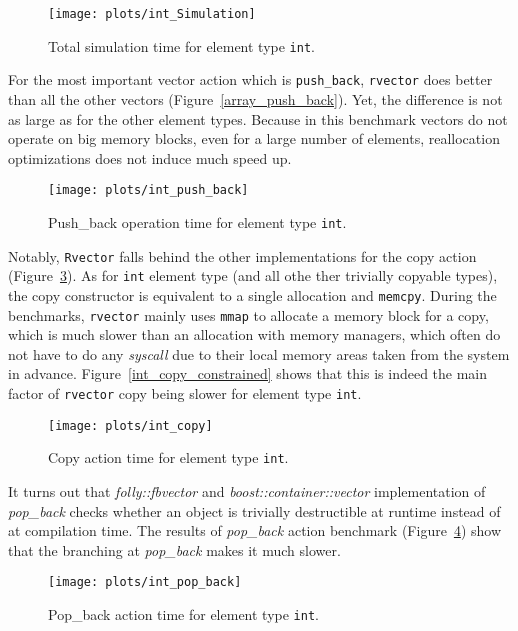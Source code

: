 \documentclass[inz, english, shortabstract]{iithesis}
\begin{document}
\begin{figure}[h!]
\texttt{[image: plots/int\_Simulation]}
\caption{Total simulation time for element type \lstinline{int}{}.}
\label{int_simulation}
\end{figure}

For the most important vector action which is {\tt push\_back}, {\tt rvector} does better than all the other vectors (Figure~\ref{array_push_back}).
Yet, the difference is not as large as for the other element types. Because in this benchmark vectors do not operate on big memory blocks, even for a large number of elements, reallocation optimizations does not induce much speed up.

\begin{figure}[h!]
\texttt{[image: plots/int\_push\_back]}
\caption{Push\_back operation time for element type \lstinline{int}{}.}
\label{int_push_back}
\end{figure}


Notably, {\tt Rvector} falls behind the other implementations for the copy action (Figure~\ref{int_copy}).
As for \lstinline{int}{} element type (and all othe ther trivially copyable types), the copy constructor is equivalent to a single allocation and {\tt memcpy}. During the benchmarks, {\tt rvector} mainly uses {\tt mmap} to allocate a memory block for a copy, which is much slower than an allocation with memory managers, which often do not have to do any \emph{syscall} due to their local memory areas taken from the system in advance.
Figure~\ref{int_copy_constrained} shows that this is indeed the main factor of {\tt rvector} copy being slower for element type \lstinline{int}{}.

\begin{figure}[h!]
\texttt{[image: plots/int\_copy]}
\caption{Copy action time for element type \lstinline{int}{}.}
\label{int_copy}
\end{figure}


It turns out that {\it folly::fbvector} and {\it boost::container::vector} implementation of {\it pop\_back} checks whether an object is trivially destructible at runtime instead of at compilation time. The results of {\it pop\_back} action benchmark (Figure~\ref{int_pop_back}) show that the branching at {\it pop\_back} makes it much slower.

\begin{figure}[h!]
\texttt{[image: plots/int\_pop\_back]}
\caption{Pop\_back action time for element type \lstinline{int}{}.}
\label{int_pop_back}
\end{figure}
\end{document}
